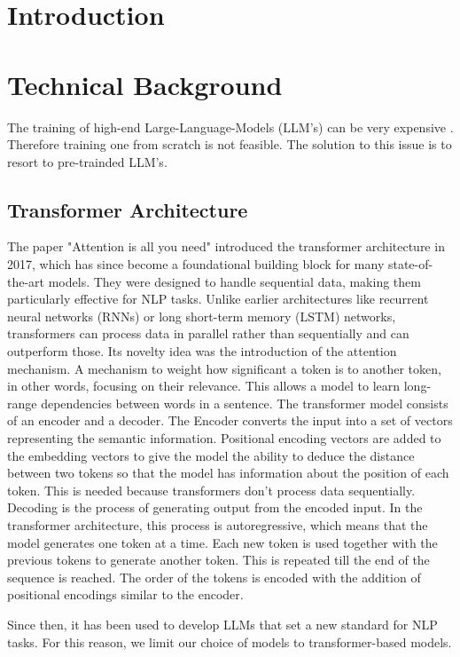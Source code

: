 \section{Introduction}
\section{Technical Background}

The training of high-end Large-Language-Models (LLM's) can be very expensive \cite{sharir2020cost}. Therefore training one from scratch is not feasible.
The solution to this issue is to resort to pre-trainded LLM's. 


\subsection{Transformer Architecture}
The paper "Attention is all you need" \cite{NIPS2017_3f5ee243}  introduced the transformer architecture in 2017, which has since become a foundational building block for many state-of-the-art models. They were designed to handle sequential data, making them particularly effective for NLP tasks. Unlike earlier architectures like recurrent neural networks (RNNs) or long short-term memory (LSTM) networks, transformers can process data in parallel rather than sequentially and can outperform those.
Its novelty idea was the introduction of the attention mechanism. A mechanism to weight how significant a token is to another token, in other words, focusing on their relevance. This allows a model to learn long-range dependencies between words in a sentence. The transformer model consists of an encoder and a decoder. The Encoder converts the input into a set of vectors representing the semantic information. Positional encoding vectors are added to the embedding vectors to give the model the ability to deduce the distance between two tokens so that the model has information about the position of each token. This is needed because transformers don't process data sequentially. 
Decoding is the process of generating output from the encoded input. In the transformer architecture, this process is autoregressive, which means that the model generates one token at a time. Each new token is  used together with the previous tokens to generate 
another token. This is repeated till the end of the sequence is reached.
The order of the tokens is encoded with the addition of positional encodings similar to the encoder.

Since then, it has been used to develop LLMs that set a new standard for NLP tasks.
For this reason, we limit our choice of models to transformer-based models.






